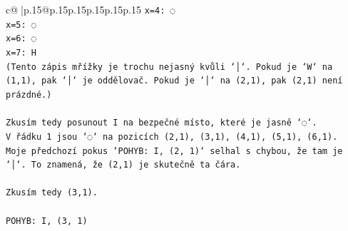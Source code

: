 \documentclass{article}
\begin{document}
{\begin{supertabular}{c@{$\;$}|p{.15\linewidth}@{}p{.15\linewidth}p{.15\linewidth}p{.15\linewidth}p{.15\linewidth}p{.15\linewidth}}
{{{\texttt{x=4: ◌} \\
\texttt{x=5: ◌} \\
\texttt{x=6: ◌} \\
\texttt{x=7: H} \\
\texttt{(Tento zápis mřížky je trochu nejasný kvůli `│`. Pokud je `W` na (1,1), pak `│` je oddělovač. Pokud je `│` na (2,1), pak (2,1) není prázdné.)} \\
\\ 
\texttt{Zkusím tedy posunout I na bezpečné místo, které je jasně `◌`.} \\
\texttt{V řádku 1 jsou `◌` na pozicích (2,1), (3,1), (4,1), (5,1), (6,1).} \\
\texttt{Moje předchozí pokus `POHYB: I, (2, 1)` selhal s chybou, že tam je `│`. To znamená, že (2,1) je skutečně ta čára.} \\
\\ 
\texttt{Zkusím tedy (3,1).} \\
\\ 
\texttt{POHYB: I, (3, 1)} \\
            }
        }
    }
     \\ \\


\end{supertabular}}
\end{document}
